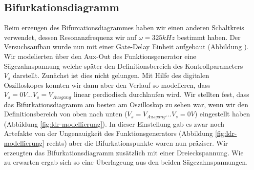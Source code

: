 \documentclass{scrartcl}
\begin{document}
\subsection { Bifurkationsdiagramm }
Beim erzeugen des Bifurcationsdiagrammes haben wir einen anderen Schaltkreis verwendet, dessen Resonanzfrequenz wir auf $\omega=325kHz$ bestimmt haben. Der Versuchsaufbau wurde nun mit einer Gate-Delay Einheit aufgebaut (Abbildung \label{fig:ldr-aufbau1}). Wir modelierten über den Aux-Out des Funktionsgenerator eine Sägezahnspannung welche später den Definitionsbereich des Kontrollparameters $V_s$ darstellt. 
Zunächst ist dies nicht gelungen. Mit Hilfe des digitalen Oszilloskopes konnten wir dann aber den Verlauf so modelieren, dass  $V_s=0V...V_s=V_{Ausgang}$ linear perdiodisch durchlaufen wird. 
Wir stellten fest, dass das Bifurkationsdiagramm am besten am Oszilloskop zu sehen war, wenn wir den Definitionsbereich von oben nach unten ($V_s=V_{Ausgang}...V_s=0V$) eingestellt haben (Abbildung \ref{fig:ldr-modellierung}). In dieser Einstellung gab es zwar noch Artefakte von der Ungenauigkeit des Funktionsgenerators (Abbildung \ref{fig:ldr-modellierung} rechts) aber die Bifurkationspunkte waren nun präziser. Wir erzeugten das Bifurkationsdiagramm zusätzlich mit einer Dreieckspannung. Wie zu erwarten ergab sich so eine Überlageung aus den beiden Sägezahnspannungen. 
\end{document}
